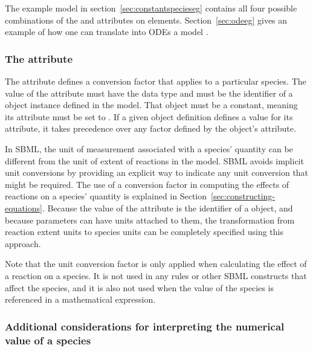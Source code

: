 The example model in section~\ref{sec:constantspecieseg} contains
all four possible combinations of the 
and  attributes on  elements.
Section~\ref{sec:odeeg} gives an example of how one can translate
into ODEs a model .


\subsubsection{The  attribute}
\label{sec:species-conversion}

The attribute  defines a conversion factor
that applies to a particular species.  The value of the attribute
must have the data type  and must be the
identifier of a \Parameter object instance defined in the model.
That \Parameter object must be a constant, meaning its
 attribute must be set to .  If a given
\Species object definition defines a value for its
 attribute, it takes precedence over any
factor defined by the \Model object's 
attribute.

In SBML, the unit of measurement associated with a species'
quantity can be different from the unit of extent of reactions in
the model.  SBML avoids implicit unit conversions by providing an
explicit way to indicate any unit conversion that might be
required.  The use of a conversion factor in computing the effects
of reactions on a species' quantity is explained in
Section~\ref{sec:constructing-equations}.  Because the value of
the  attribute is the identifier of a
\Parameter object, and because parameters can have units attached
to them, the transformation from reaction extent units to species
units can be completely specified using this approach.

Note that the unit conversion factor is only applied when
calculating the effect of a reaction on a species.  It is not used
in any rules or other SBML constructs that affect the species, and
it is also not used when the value of the species is referenced in
a mathematical expression.


\subsubsection{Additional considerations for interpreting the
  numerical value of a species}
\label{sec:species-meaning}

